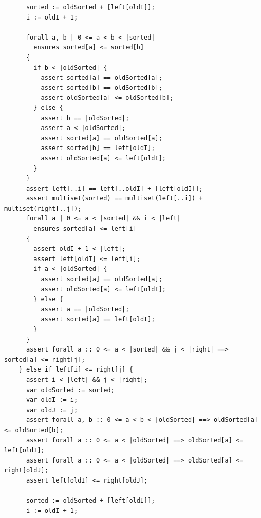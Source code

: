 \documentclass{article}
\begin{document}
\begin{lstlisting}
      sorted := oldSorted + [left[oldI]];
      i := oldI + 1;

      forall a, b | 0 <= a < b < |sorted|
        ensures sorted[a] <= sorted[b]
      {
        if b < |oldSorted| {
          assert sorted[a] == oldSorted[a];
          assert sorted[b] == oldSorted[b];
          assert oldSorted[a] <= oldSorted[b];
        } else {
          assert b == |oldSorted|;
          assert a < |oldSorted|;
          assert sorted[a] == oldSorted[a];
          assert sorted[b] == left[oldI];
          assert oldSorted[a] <= left[oldI];
        }
      }
      assert left[..i] == left[..oldI] + [left[oldI]];
      assert multiset(sorted) == multiset(left[..i]) + multiset(right[..j]);
      forall a | 0 <= a < |sorted| && i < |left|
        ensures sorted[a] <= left[i]
      {
        assert oldI + 1 < |left|;
        assert left[oldI] <= left[i];
        if a < |oldSorted| {
          assert sorted[a] == oldSorted[a];
          assert oldSorted[a] <= left[oldI];
        } else {
          assert a == |oldSorted|;
          assert sorted[a] == left[oldI];
        }
      }
      assert forall a :: 0 <= a < |sorted| && j < |right| ==> sorted[a] <= right[j];
    } else if left[i] <= right[j] {
      assert i < |left| && j < |right|;
      var oldSorted := sorted;
      var oldI := i;
      var oldJ := j;
      assert forall a, b :: 0 <= a < b < |oldSorted| ==> oldSorted[a] <= oldSorted[b];
      assert forall a :: 0 <= a < |oldSorted| ==> oldSorted[a] <= left[oldI];
      assert forall a :: 0 <= a < |oldSorted| ==> oldSorted[a] <= right[oldJ];
      assert left[oldI] <= right[oldJ];

      sorted := oldSorted + [left[oldI]];
      i := oldI + 1;


\end{lstlisting}
\end{document}
